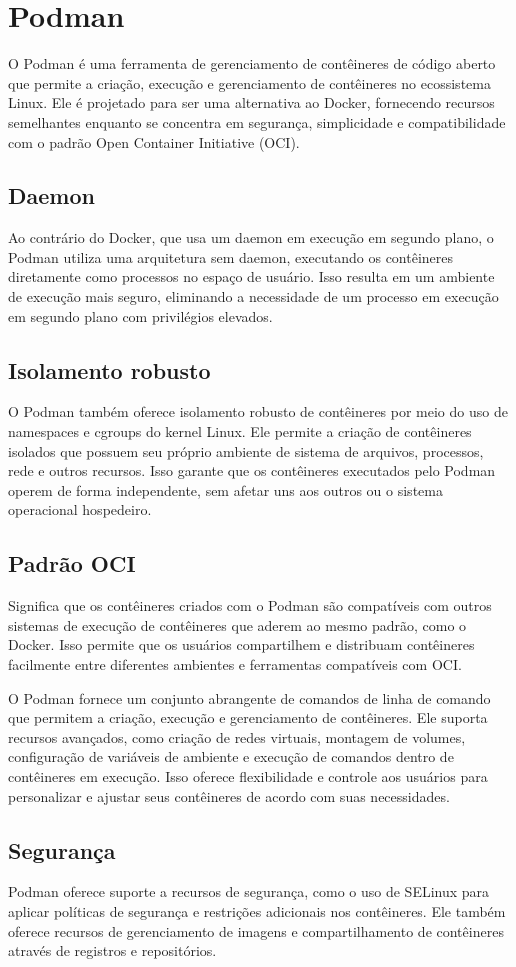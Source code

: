 \section{Podman}

O Podman é uma ferramenta de gerenciamento de contêineres de código aberto que permite a criação, execução e gerenciamento de contêineres no ecossistema Linux. Ele é projetado para ser uma alternativa ao Docker, fornecendo recursos semelhantes enquanto se concentra em segurança, simplicidade e compatibilidade com o padrão Open Container Initiative (OCI).


\subsection{Daemon}
Ao contrário do Docker, que usa um daemon em execução em segundo plano, o Podman utiliza uma arquitetura sem daemon, executando os contêineres diretamente como processos no espaço de usuário. Isso resulta em um ambiente de execução mais seguro, eliminando a necessidade de um processo em execução em segundo plano com privilégios elevados.

\subsection{Isolamento robusto}
O Podman também oferece isolamento robusto de contêineres por meio do uso de namespaces e cgroups do kernel Linux. Ele permite a criação de contêineres isolados que possuem seu próprio ambiente de sistema de arquivos, processos, rede e outros recursos. Isso garante que os contêineres executados pelo Podman operem de forma independente, sem afetar uns aos outros ou o sistema operacional hospedeiro.

\subsection{Padrão OCI}
Significa que os contêineres criados com o Podman são compatíveis com outros sistemas de execução de contêineres que aderem ao mesmo padrão, como o Docker. Isso permite que os usuários compartilhem e distribuam contêineres facilmente entre diferentes ambientes e ferramentas compatíveis com OCI.

O Podman fornece um conjunto abrangente de comandos de linha de comando que permitem a criação, execução e gerenciamento de contêineres. Ele suporta recursos avançados, como criação de redes virtuais, montagem de volumes, configuração de variáveis de ambiente e execução de comandos dentro de contêineres em execução. Isso oferece flexibilidade e controle aos usuários para personalizar e ajustar seus contêineres de acordo com suas necessidades.

\subsection{Segurança}
 Podman oferece suporte a recursos de segurança, como o uso de SELinux para aplicar políticas de segurança e restrições adicionais nos contêineres. Ele também oferece recursos de gerenciamento de imagens e compartilhamento de contêineres através de registros e repositórios.